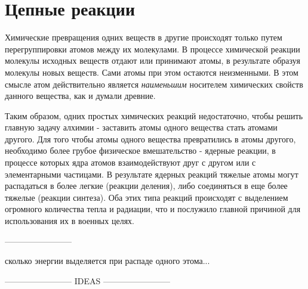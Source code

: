 \section*{Цепные реакции}

Химические превращения одних веществ в другие происходят только путем перегруппировки атомов между их молекулами.
В процессе химической реакции молекулы исходных веществ отдают или принимают атомы, в результате образуя молекулы новых веществ. 
Сами атомы при этом остаются неизменными.
В этом смысле атом действительно является \textit{наименьшим} носителем химических свойств данного вещества, как и думали древние.

Таким образом, одних простых химических реакций недостаточно, чтобы решить главную задачу алхимии - заставить атомы одного вещества стать атомами другого.
Для того чтобы атомы одного вещества превратились в атомы другого, необходимо более грубое физическое вмешательство - ядерные реакции, в процессе которых ядра атомов взаимодействуют друг с другом или с элементарными частицами.
В результате ядерных реакций тяжелые атомы могут распадаться в более легкие (реакции деления), либо соединяться в еще более тяжелые (реакции синтеза).
Оба этих типа реакций происходят с выделением огромного количества тепла и радиации, что и послужило главной причиной для использования их в военных целях.

------------------------

сколько энергии выделяется при распаде одного этома...





------------------------ IDEAS ------------------------ 



